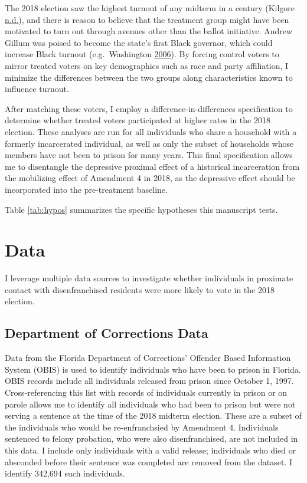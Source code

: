 \documentclass[
  12pt,
]{article}
\begin{document}
The 2018 election saw the highest turnout of any midterm in a century (Kilgore \protect\hyperlink{ref-Kilgore2018}{n.d.}), and there is reason to believe that the treatment group might have been motivated to turn out through avenues other than the ballot initiative. Andrew Gillum was poised to become the state's first Black governor, which could increase Black turnout (e.g.~Washington \protect\hyperlink{ref-Washington2006}{2006}). By forcing control voters to mirror treated voters on key demographics such as race and party affiliation, I minimize the differences between the two groups along characteristics known to influence turnout.

After matching these voters, I employ a difference-in-differences specification to determine whether treated voters participated at higher rates in the 2018 election. These analyses are run for all individuals who share a household with a formerly incarcerated individual, as well as only the subset of households whose members have not been to prison for many years. This final specification allows me to disentangle the depressive proximal effect of a historical incarceration from the mobilizing effect of Amendment 4 in 2018, as the depressive effect should be incorporated into the pre-treatment baseline.

Table \ref{tab:hypos} summarizes the specific hypotheses this manuscript tests.



\hypertarget{data}{%
\section*{Data}\label{data}}

I leverage multiple data sources to investigate whether individuals in proximate contact with disenfranchised residents were more likely to vote in the 2018 election.

\hypertarget{department-of-corrections-data}{%
\subsection*{Department of Corrections Data}\label{department-of-corrections-data}}

Data from the Florida Department of Corrections' Offender Based Information System (OBIS) is used to identify individuals who have been to prison in Florida. OBIS records include all individuals released from prison since October 1, 1997. Cross-referencing this list with records of individuals currently in prison or on parole allows me to identify all individuals who had been to prison but were not serving a sentence at the time of the 2018 midterm election. These are a subset of the individuals who would be re-enfranchsied by Amendment 4. Individuals sentenced to felony probation, who were also disenfranchised, are not included in this data. I include only individuals with a valid release; individuals who died or absconded before their sentence was completed are removed from the dataset. I identify 342,694 such individuals.
\end{document}
